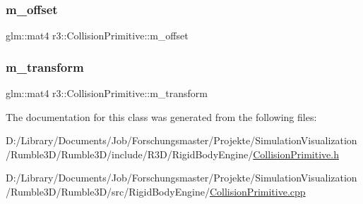\subsubsection{\texorpdfstring{m\+\_\+offset}{m\_offset}}
{\footnotesize\ttfamily glm\+::mat4 r3\+::\+Collision\+Primitive\+::m\+\_\+offset\hspace{0.3cm}{\ttfamily [protected]}}

\mbox{\label{classr3_1_1_collision_primitive_a0cb28517e7791b9836a5cac5d8550b13}} 
\subsubsection{\texorpdfstring{m\+\_\+transform}{m\_transform}}
{\footnotesize\ttfamily glm\+::mat4 r3\+::\+Collision\+Primitive\+::m\+\_\+transform\hspace{0.3cm}{\ttfamily [protected]}}



The documentation for this class was generated from the following files\+:\begin{DoxyCompactItemize}
\item 
D\+:/\+Library/\+Documents/\+Job/\+Forschungsmaster/\+Projekte/\+Simulation\+Visualization/\+Rumble3\+D/\+Rumble3\+D/include/\+R3\+D/\+Rigid\+Body\+Engine/\mbox{\hyperlink{_collision_primitive_8h}{Collision\+Primitive.\+h}}\item 
D\+:/\+Library/\+Documents/\+Job/\+Forschungsmaster/\+Projekte/\+Simulation\+Visualization/\+Rumble3\+D/\+Rumble3\+D/src/\+Rigid\+Body\+Engine/\mbox{\hyperlink{_collision_primitive_8cpp}{Collision\+Primitive.\+cpp}}\end{DoxyCompactItemize}
